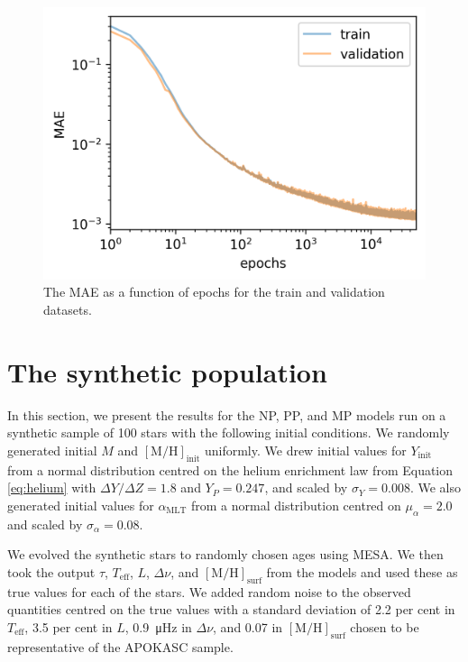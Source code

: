 \documentclass[fleqn,usenatbib]{mnras}
\newcommand{\dnu}{\ensuremath{\Delta\nu}}
\newcommand{\metallicity}{\ensuremath{[\mathrm{M}/\mathrm{H}]}}
\newcommand{\teff}{\ensuremath{T_\mathrm{eff}}}
\newcommand{\mlt}{\ensuremath{{\alpha_\mathrm{MLT}}}}
\begin{document}
\begin{figure}
    \centering
    \includegraphics[width=\linewidth]{figures/loss.png}
    \caption{The MAE as a function of epochs for the train and validation datasets.}
    \label{fig:loss}
\end{figure}

\section{The synthetic population}\label{sec:test-stars}



In this section, we present the results for the NP, PP, and MP models run on a synthetic sample of 100 stars with the following initial conditions. We randomly generated initial $M$ and $\metallicity_\mathrm{init}$ uniformly. We drew initial values for $Y_\mathrm{init}$ from a normal distribution centred on the helium enrichment law from Equation \ref{eq:helium} with $\Delta Y / \Delta Z = 1.8$ and $Y_P = 0.247$, and scaled by $\sigma_Y = 0.008$. We also generated initial values for $\mlt$ from a normal distribution centred on $\mu_\alpha = 2.0$ and scaled by $\sigma_\alpha = 0.08$.

We evolved the synthetic stars to randomly chosen ages using \textsc{MESA}. We then took the output $\tau$, $\teff$, $L$, $\dnu$, and $\metallicity_\mathrm{surf}$ from the models and used these as true values for each of the stars. We added random noise to the observed quantities centred on the true values with a standard deviation of 2.2 per cent in $\teff$, 3.5 per cent in $L$, \SI{0.9}{\micro\hertz} in $\dnu$, and \SI{0.07}{\dex} in $\metallicity_\mathrm{surf}$ chosen to be representative of the APOKASC sample.
\end{document}
